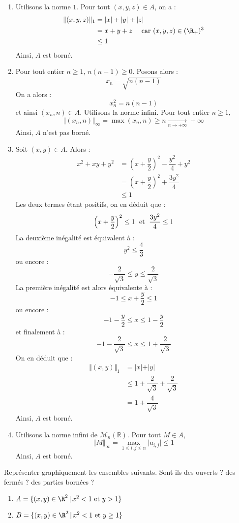\documentclass[a4paper,10pt]{report}
\begin{document}
\begin{enumerate}
\item Utilisons la norme $1$. Pour tout $(x,y,z) \in A$, on a :
\begin{align*}
\Vert (x,y,z) \Vert_1 & = \vert x \vert + \vert y \vert + \vert z \vert \\
& = x+y+z \quad \hbox{ car } (x,y,z) \in  (\R_+)^3 \\
&  \leq 1
\end{align*}
Ainsi, $A$ est borné.
\item Pour tout entier $n \geq 1$, $ n(n-1) \geq 0$. Posons alors :
$$ x_n = \sqrt{n(n-1)}$$
On a alors :
$$ x_n^2= n(n-1)$$
et ainsi $(x_n,n) \in A$. Utilisons la norme infini. Pour tout entier $n \geq 1$,
$$ \Vert (x_n,n) \Vert_{\infty} = \max(x_n,n) \geq n \underset{n \rightarrow + \infty}{\longrightarrow} + \infty$$
Ainsi, $A$ n'est pas borné.
\item Soit $(x,y) \in A$. Alors :
\begin{align*}
x^2+xy+y^2 & = \left( x+\dfrac{y}{2}  \right)^2 - \dfrac{y^2}{4}+ y^2 \\
& = \left( x+\dfrac{y}{2}  \right)^2  + \dfrac{3y^2}{4} \\
& \leq 1
\end{align*}
Les deux termes étant positifs, on en déduit que :
$$ \left( x+\dfrac{y}{2}  \right)^2 \leq 1 \; \hbox{ et } \; \dfrac{3y^2}{4} \leq 1 $$
La deuxième inégalité est équivalent à :
$$ y^2 \leq \dfrac{4}{3}$$
ou encore :
$$ - \dfrac{2}{\sqrt{3}} \leq y \leq \dfrac{2}{\sqrt{3}}$$
La première inégalité est alors équivalente à :
$$ -1 \leq x+\dfrac{y}{2} \leq 1 $$
ou encore :
$$ -1 - \dfrac{y}{2} \leq x \leq 1- \dfrac{y}{2}$$
et finalement à :
$$ -1 - \dfrac{2}{\sqrt{3}} \leq x \leq 1 + \dfrac{2}{\sqrt{3}}$$
On en déduit que :
\begin{align*}
\Vert (x,y) \Vert_1 & = \vert x \vert + \vert y \vert \\
& \leq 1+ \dfrac{2}{\sqrt{3}} + \dfrac{2}{\sqrt{3}} \\
& = 1 + \dfrac{4}{\sqrt{3}}
\end{align*}
Ainsi, $A$ est borné.
\item Utilisons la norme infini de $\mathcal{M}_n(\mathbb{R})$. Pour tout $M \in A$,
$$ \Vert M \Vert_{\infty} = \max_{1 \leq i,j \leq n} \vert a_{i,j} \vert  \leq 1$$
Ainsi, $A$ est borné.
\end{enumerate}

\begin{Exercice}{} Repr\'esenter graphiquement les ensembles suivants. Sont-ils des ouverts ? des ferm\'es ? des parties bornées ?
\begin{enumerate}
\item $A = \lbrace (x,y)\in\R^2 \, \vert \, x^2 < 1 \hbox{ et } y> 1\rbrace$
\item $B = \lbrace (x,y)\in\R^2 \, \vert \, x^2 < 1 \hbox{ et } y \geq 1\rbrace$
\end{enumerate}
\end{Exercice}
\end{document}

